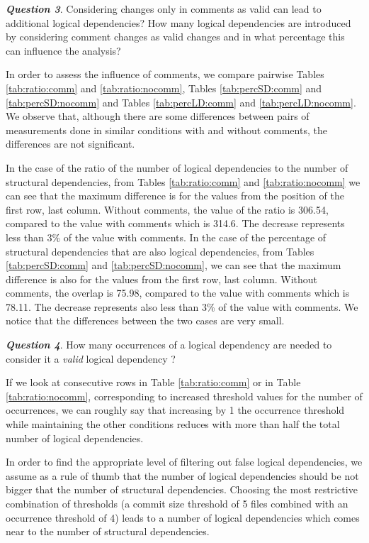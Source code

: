 \documentclass[a4paper,twoside]{article}
\begin{document}
\textit{\textbf{Question 3}}. Considering changes only in comments as valid can lead to additional logical dependencies? How many logical dependencies are introduced by considering comment changes as valid changes and in what percentage this can influence the analysis?

In order to assess the influence of comments, we compare pairwise Tables \ref{tab:ratio:comm} and \ref{tab:ratio:nocomm},  
Tables \ref{tab:percSD:comm} and \ref{tab:percSD:nocomm} and Tables \ref{tab:percLD:comm} and \ref{tab:percLD:nocomm}. 
We observe that, although there are some differences between pairs of measurements done in similar conditions with and without comments, the differences are not significant.

In the case of the ratio of the number of logical dependencies to the number of structural dependencies, from Tables \ref{tab:ratio:comm} and \ref{tab:ratio:nocomm} we can see that the maximum difference is for the values from the position of the first row, last column. Without comments, the value of the ratio is 306.54, compared to the value with comments which is 314.6. The decrease represents less than 3\% of the value with comments. In the case of the percentage of structural dependencies that are also logical dependencies, from Tables \ref{tab:percSD:comm} and \ref{tab:percSD:nocomm}, we can see that the maximum difference is also for the values from the first row, last column. Without comments, the overlap is 75.98, compared to the value with comments which is 78.11.  The decrease represents also less than 3\% of the value with comments. We notice that the differences between the two cases are very small. %



\textit{\textbf{Question 4}}. How many occurrences of a logical dependency are needed to consider it a \textit{valid} logical dependency ? 

If we look at consecutive rows in Table \ref{tab:ratio:comm} or in Table \ref{tab:ratio:nocomm}, corresponding to increased threshold values for the number of occurrences, we can roughly say that  increasing by 1 the occurrence threshold while maintaining the other conditions reduces with more than half the total number of logical dependencies.  

In order to find the appropriate level of filtering out false logical dependencies, we assume as a rule of thumb that the number of logical dependencies should be not bigger that the number of structural dependencies. Choosing the most restrictive combination of thresholds (a commit size threshold of 5 files combined with an occurrence threshold of 4) leads to a number of logical dependencies which comes near to the number of structural dependencies.
\end{document}
